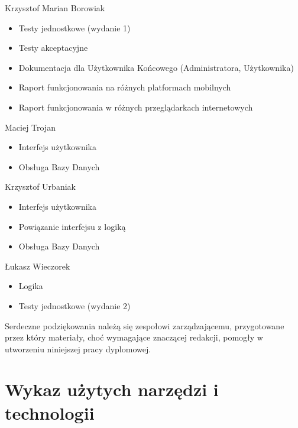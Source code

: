 \begin{description}
\item Krzysztof Marian Borowiak

\begin{itemize}
\item Testy jednostkowe (wydanie 1)
\item Testy akceptacyjne
\item Dokumentacja dla Użytkownika Końcowego (Administratora, Użytkownika)
\item Raport funkcjonowania na różnych platformach mobilnych
\item Raport funkcjonowania w różnych przeglądarkach internetowych
\end{itemize}
\noindent

\item Maciej Trojan

\begin{itemize}
\item Interfejs użytkownika
\item Obsługa Bazy Danych
\end{itemize}
\noindent

\item Krzysztof Urbaniak

\begin{itemize}
\item Interfejs użytkownika
\item Powiązanie interfejsu z logiką
\item Obsługa Bazy Danych
\end{itemize}
\noindent

\item Łukasz Wieczorek

\begin{itemize}
\item Logika
\item Testy jednostkowe (wydanie 2)
\end{itemize}
\noindent

\end{description}

Serdeczne podziękowania należą się zespołowi zarządzającemu, przygotowane przez który materiały, choć wymagające znaczącej redakcji, pomogły w utworzeniu niniejszej pracy dyplomowej.

\section{Wykaz użytych narzędzi i technologii}
\label{ChapterA4}

